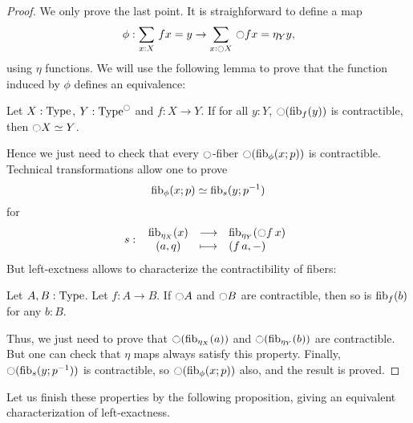 \begin{proof}
  We only prove the last point.
  It is straighforward to define a map
  \[ \phi:\sum_{x:X}\, f x = y\to
    \sum_{x:\ocircle X}\, \ocircle f x = \eta_Y y,\]
  using $\eta$ functions.
  We will use the following lemma to prove that the function induced
  by $\phi$ defines an equivalence:
  \begin{lem}
    Let $X:\operatorname{Type}$, $Y:\operatorname{Type}^{\ocircle}$ and $f:X\to Y$. If for all $y:Y$,
    $\ocircle (\mathrm{fib}_{f}(y))$ is contractible, then $\ocircle X \simeq Y$.
  \end{lem}
  Hence we just need to check that every $\ocircle$-fiber $\ocircle(\mathrm{fib}_{\phi}(x;p))$ is contractible.
  Technical transformations allow one to prove
  \[ \mathrm{fib}_{\phi}(x;p) \simeq \mathrm{fib}_{s}(y;p^{-1})\]
  for
  \[
    s \, \colon \left. \begin{array}{ccl} \mathrm{fib}_{\eta_X}(x) & \longrightarrow & \mathrm{fib}_{\eta_Y}(\ocircle f\, x) \\ (a,q) & \longmapsto & (f\, a,-) \end{array} \right.
  \]
  But left-exctness allows to characterize the contractibility of fibers:
  \begin{lem}
    Let $A,B:\operatorname{Type}$. Let $f:A\to B$. If $\ocircle A$ and $\ocircle B$ are
    contractible, then so is $\mathrm{fib}_{f}(b)$ for any $b:B$.
  \end{lem}
  Thus, we just need to prove that $\ocircle(\mathrm{fib}_{\eta_X}(a))$ and
  $\ocircle(\mathrm{fib}_{\eta_Y}(b))$ are contractible. But one can check that
  $\eta$ maps always satisfy this property.
  Finally, $\ocircle(\mathrm{fib}_{s}(y;p^{-1}))$ is contractible, so $\ocircle(\mathrm{fib}_{\phi}(x;p))$ also, and the result is proved.

\end{proof}

Let us finish these properties by the following proposition, giving
an equivalent characterization of left-exactness.

